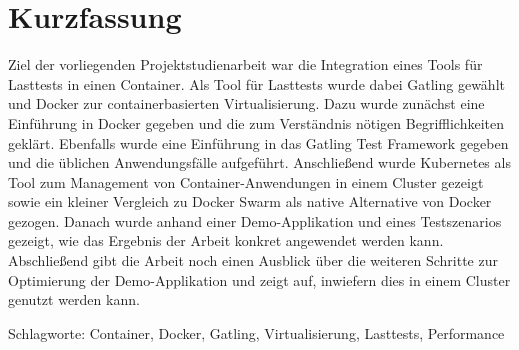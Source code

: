 \chapter*{Kurzfassung}
\thispagestyle{empty}

\bigskip

Ziel der vorliegenden Projektstudienarbeit war die Integration eines Tools für Lasttests in einen Container.
Als Tool für Lasttests wurde dabei Gatling gewählt und Docker zur containerbasierten Virtualisierung.
Dazu wurde zunächst eine Einführung in Docker gegeben und die zum Verständnis nötigen Begrifflichkeiten geklärt.
Ebenfalls wurde eine Einführung in das Gatling Test Framework gegeben und die üblichen Anwendungsfälle aufgeführt.
Anschließend wurde Kubernetes als Tool zum Management von Container-Anwendungen in einem Cluster gezeigt sowie ein kleiner Vergleich zu Docker Swarm als native Alternative von Docker gezogen.
Danach wurde anhand einer Demo-Applikation und eines Testszenarios gezeigt, wie das Ergebnis der Arbeit konkret angewendet werden kann.
Abschließend gibt die Arbeit noch einen Ausblick über die weiteren Schritte zur Optimierung der Demo-Applikation und zeigt auf, inwiefern dies in einem Cluster genutzt werden kann.

\noindent

\vspace*{\fill}
Schlagworte: 
Container, Docker, Gatling, Virtualisierung, Lasttests, Performance
